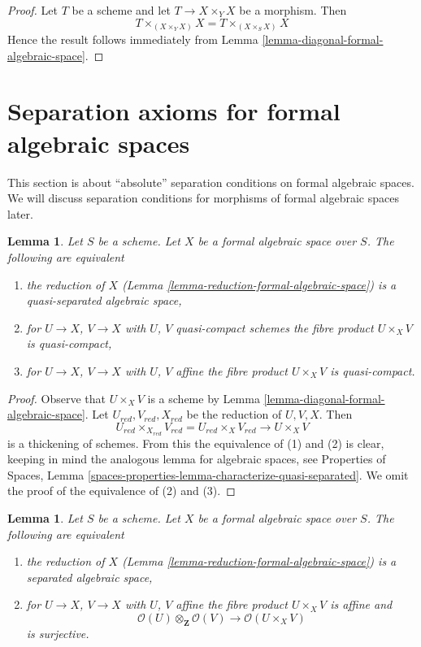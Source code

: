 \documentclass{stacks-project}
\theoremstyle{plain}
\newtheorem{lemma}[subsection]{Lemma}
\theoremstyle{definition}
\theoremstyle{remark}
\numberwithin{equation}{subsection}
\begin{document}
\begin{proof}
Let $T$ be a scheme and let $T \to X \times_Y X$ be a morphism.
Then
$$
T \times_{(X \times_Y X)} X = T \times_{(X \times_S X)} X
$$
Hence the result follows immediately from
Lemma \ref{lemma-diagonal-formal-algebraic-space}.
\end{proof}






\section{Separation axioms for formal algebraic spaces}
\label{section-separation}

\noindent
This section is about ``absolute'' separation conditions on formal algebraic
spaces. We will discuss separation conditions for morphisms of formal
algebraic spaces later.

\begin{lemma}
\label{lemma-characterize-quasi-separated}
Let $S$ be a scheme. Let $X$ be a formal algebraic space over $S$.
The following are equivalent
\begin{enumerate}
\item the reduction of $X$
(Lemma \ref{lemma-reduction-formal-algebraic-space}) is a
quasi-separated algebraic space,
\item for $U \to X$, $V \to X$ with $U$, $V$ quasi-compact schemes
the fibre product $U \times_X V$ is quasi-compact,
\item for $U \to X$, $V \to X$ with $U$, $V$ affine
the fibre product $U \times_X V$ is quasi-compact.
\end{enumerate}
\end{lemma}

\begin{proof}
Observe that $U \times_X V$ is a scheme by
Lemma \ref{lemma-diagonal-formal-algebraic-space}.
Let $U_{red}, V_{red}, X_{red}$ be the reduction of $U, V, X$.
Then
$$
U_{red} \times_{X_{red}} V_{red} = U_{red} \times_X V_{red} \to U \times_X V
$$
is a thickening of schemes. From this the equivalence of (1) and (2)
is clear, keeping in mind the analogous lemma for algebraic spaces, see
Properties of Spaces, Lemma
\ref{spaces-properties-lemma-characterize-quasi-separated}.
We omit the proof of the equivalence of (2) and (3).
\end{proof}

\begin{lemma}
\label{lemma-characterize-separated}
Let $S$ be a scheme. Let $X$ be a formal algebraic space over $S$.
The following are equivalent
\begin{enumerate}
\item the reduction of $X$
(Lemma \ref{lemma-reduction-formal-algebraic-space}) is a separated
algebraic space,
\item for $U \to X$, $V \to X$ with $U$, $V$ affine
the fibre product $U \times_X V$ is affine and
$$
\mathcal{O}(U) \otimes_\mathbf{Z} \mathcal{O}(V)
\longrightarrow
\mathcal{O}(U \times_X V)
$$
is surjective.
\end{enumerate}
\end{lemma}
\end{document}
